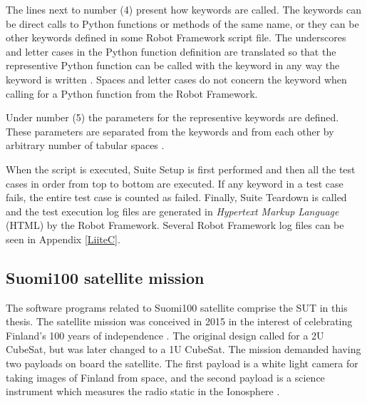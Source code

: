 \documentclass[english,12pt,a4paper,pdftex,elec,utf8]{aaltothesis}
\begin{document}
The lines next to number (4) present how keywords are called. The keywords can be direct calls to Python functions or methods of the same name, or they can be other keywords defined in some Robot Framework script file. The underscores and letter cases in the Python function definition are translated so that the representive Python function can be called with the keyword in any way the keyword is written \cite{robotuserguide}. Spaces and letter cases do not concern the keyword when calling for a Python function from the Robot Framework.\par 
Under number (5) the parameters for the representive keywords are defined. These parameters are separated from the keywords and from each other by arbitrary number of tabular spaces \cite{robotuserguide}.\par
When the script is executed, Suite Setup is first performed and then all the test cases in order from top to bottom are executed. If any keyword in a test case fails, the entire test case is counted as failed. Finally, Suite Teardown is called and the test execution log files are generated in \textit{Hypertext Markup Language} (HTML) by the Robot Framework. Several Robot Framework log files can be seen in Appendix \ref{LiiteC}. \cite{robotuserguide}
\subsection{Suomi100 satellite mission}
The software programs related to Suomi100 satellite comprise the SUT in this thesis. The satellite mission was conceived in 2015 in the interest of celebrating Finland's 100 years of independence \cite{s1002015}. The original design called for a 2U CubeSat, but was later changed to a 1U CubeSat. The mission demanded having two payloads on board the satellite. The first payload is a white light camera for taking images of Finland from space, and the second payload is a science instrument which measures the radio static in the Ionosphere \cite{s100blogi, s1002015}.\par
\end{document}
